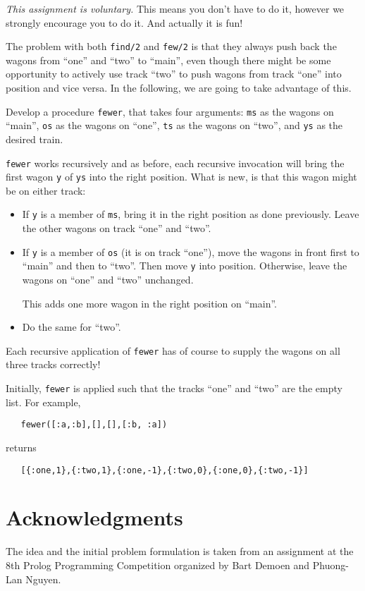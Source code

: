 \documentclass[a4paper,11pt]{article}
\begin{document}
\emph{This assignment is voluntary.} This means you don't have to
do it, however we strongly encourage you to do it. And actually
it is fun!

The problem with both \verb+find/2+ and \verb+few/2+ is that they
always push back the wagons from ``one'' and ``two'' to ``main'',
even though there might be some opportunity to actively use track
``two'' to push wagons from track ``one'' into position and vice
versa. In the following, we are going to take advantage of this.

Develop a procedure \verb+fewer+, that takes four arguments:
\verb+ms+ as the wagons on ``main'', \verb+os+ as the wagons on ``one'',
\verb+ts+ as the wagons on ``two'', and \verb+ys+ as the desired train.

\verb+fewer+ works recursively and as before, each recursive
invocation will bring the first wagon \verb+y+ of \verb+ys+ into the right
position. What is new, is that this wagon might be on either
track:
\begin{itemize}
\item If \verb+y+ is a member of \verb+ms+, bring it in the right
  position as done previously. Leave the other wagons on track
  ``one'' and ``two''.
\item If \verb+y+ is a member of \verb+os+ (it is on track ``one''), move
  the wagons in front first to ``main'' and then to ``two''. Then
  move \verb+y+ into position. Otherwise, leave the wagons on ``one''
  and ``two'' unchanged.

  This adds one more wagon in the right position on ``main''.
\item Do the same for ``two''.
\end{itemize}

Each recursive application of \verb+fewer+ has of course to
supply the wagons on all three tracks correctly!

Initially, \verb+fewer+ is applied such that the tracks ``one''
and ``two'' are the empty list. For example,
\begin{verbatim}
   fewer([:a,:b],[],[],[:b, :a])
\end{verbatim}
returns
\begin{verbatim}
   [{:one,1},{:two,1},{:one,-1},{:two,0},{:one,0},{:two,-1}]
\end{verbatim}

\section{Acknowledgments}

The idea and the initial problem formulation is taken from an
assignment at the 8th Prolog Programming Competition organized by Bart
Demoen and Phuong-Lan Nguyen. 
\end{document}
